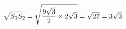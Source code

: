 \documentclass[preview]{standalone}
\begin{document}
\begin{align*}
\special{dvisvgm:raw <g id='unique000'>}\sqrt{S_1 S_2}=\sqrt{\frac{9\sqrt{3}}{2}\times 2\sqrt{3}}=\sqrt{27}=3\sqrt{3}\special{dvisvgm:raw </g>}
\end{align*}
\end{document}
